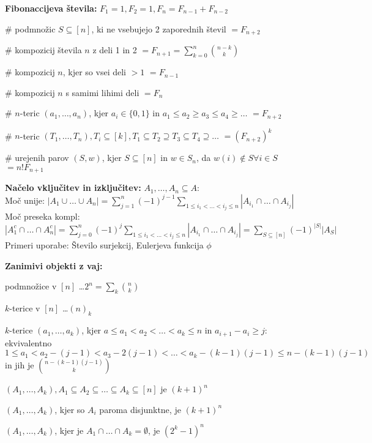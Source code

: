 \documentclass[a4paper, oneside, 12pt]{article}
\theoremstyle{definition}
\newenvironment{itemize*}{\vspace{-10pt}\begin{itemize}\setlength{\itemsep}{0pt}\setlength{\parskip}{2pt}}{\end{itemize}}
\begin{document}

\textbf{Fibonaccijeva števila:} $F_1 = 1, F_2 = 1, F_n = F_{n-1} + F_{n-2}$
\begin{itemize*}
  \item \# podmnožic $S \subseteq [n]$, ki ne vsebujejo 2 zaporednih števil $ = F_{n+2}$
  \item \# kompozicij števila $n$ z deli 1 in 2 $ = F_{n+1} = \sum_{k = 0}^n \binom{n-k}{k}$
  \item \# kompozicij $n$, kjer so vsei deli $> 1$ $= F_{n-1}$
  \item \# kompozicij $n$ s samimi lihimi deli $= F_n$
  \item \# $n$-teric $(a_1, \ldots, a_n)$, kjer $a_i \in \{0, 1\}$ in $a_1 \leq a_2 \geq a_3 \leq a_4 \geq \ldots$ $= F_{n+2}$
  \item \# $n$-teric $(T_1, \ldots, T_n), T_i \subseteq [k], T_1 \subseteq T_2 \supseteq T_3 \subseteq T_4 \supseteq \ldots$ $= (F_{n+2})^k$
  \item \# urejenih parov $(S, w)$, kjer $S \subseteq[n]$ in $w \in S_n$, da $w(i) \notin S \forall i \in S$ $= n! F_{n+1}$
\end{itemize*}


\textbf{Načelo vključitev in izključitev:}
$A_1, \ldots, A_n \subseteq A$:  \\
Moč unije: $|A_1 \cup \ldots \cup A_n| = \sum_{j = 1}^n (-1)^{j-1} \sum_{1\leq i_1 < \ldots < i_j \leq n }
  |A_{i_1} \cap \ldots \cap A_{i_j}|$ \\
Moč preseka kompl: $|A_1^c \cap \ldots \cap A_n^c| = \sum_{j = 0}^n (-1)^j \sum_{1\leq i_1 < \ldots < i_j \leq n }
  |A_{i_1} \cap \ldots \cap A_{i_j}| = \sum_{S \subseteq [n]} (-1)^{|S|} |A_S|$ \\
Primeri uporabe: Število surjekcij, Eulerjeva funkcija $\phi$


\textbf{Zanimivi objekti z vaj:}
\begin{itemize*}
  \item podmnožice v $[n]$ \ldots $2^n = \sum_k \binom{n}{k}$
  \item $k$-terice v $[n]$ \ldots $(n)_k$
  \item $k$-terice $(a_1, \ldots, a_k)$, kjer $a \leq a_1 < a_2 < \ldots < a_k \leq n$ in $a_{i+1} - a_i \geq j$: ekvivalentno $1 \leq a_1 < a_2 - (j-1) < a_3 - 2(j-1) < \ldots < a_k - (k-1) (j-1) \leq n - (k-1)(j-1)$ in jih je $\binom{n-(k-1)(j-1)}{k}$
  \item $(A_1, \ldots, A_k), A_1 \subseteq A_2 \subseteq \ldots \subseteq A_k \subseteq [n]$ je $(k+1)^n$
  \item $(A_1, \ldots, A_k)$, kjer so $A_i$ paroma disjunktne, je $(k+1)^n$
  \item $(A_1, \ldots, A_k)$, kjer je $A_1 \cap \ldots \cap A_k = \emptyset$, je $(2^k - 1)^n$
\end{itemize*}
\end{document}
